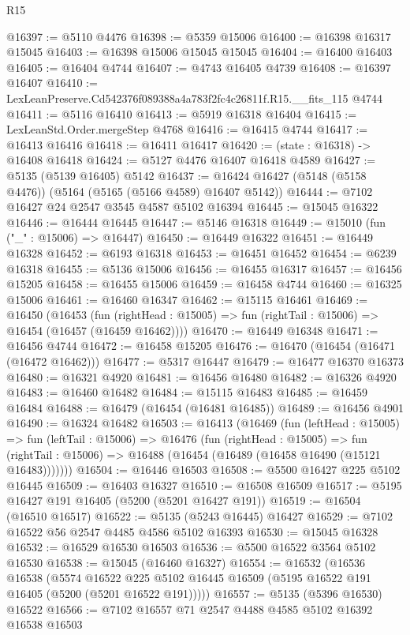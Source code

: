 \begin{lexlean}{R15}
\begin{coremodule}
{{{{{{{{{{{@16397 := @5110 @4476
@16398 := @5359 @15006
@16400 := @16398 @16317 @15045
@16403 := @16398 @15006 @15045 @15045
@16404 := @16400 @16403
@16405 := @16404 @4744
@16407 := @4743 @16405 @4739
@16408 := @16397 @16407
@16410 := LexLeanPreserve.Cd542376f089388a4a783f2fc4c26811f.R15.__fits_115 @4744
@16411 := @5116 @16410
@16413 := @5919 @16318 @16404
@16415 := LexLeanStd.Order.mergeStep @4768
@16416 := @16415 @4744
@16417 := @16413 @16416
@16418 := @16411 @16417
@16420 := (state : @16318) -> @16408 @16418
@16424 := @5127 @4476 @16407 @16418 @4589
@16427 := @5135 (@5139 @16405) @5142
@16437 := @16424 @16427 (@5148 (@5158 @4476)) (@5164 (@5165 (@5166 @4589) @16407 @5142))
@16444 := @7102 @16427 @24 @2547 @3545 @4587 @5102 @16394
@16445 := @15045 @16322
@16446 := @16444 @16445
@16447 := @5146 @16318
@16449 := @15010 (fun ("_" : @15006) => @16447)
@16450 := @16449 @16322
@16451 := @16449 @16328
@16452 := @6193 @16318
@16453 := @16451 @16452
@16454 := @6239 @16318
@16455 := @5136 @15006
@16456 := @16455 @16317
@16457 := @16456 @15205
@16458 := @16455 @15006
@16459 := @16458 @4744
@16460 := @16325 @15006
@16461 := @16460 @16347
@16462 := @15115 @16461
@16469 := @16450
    (@16453
      (fun (rightHead : @15005) => fun (rightTail : @15006) => @16454 (@16457 (@16459 @16462))))
@16470 := @16449 @16348
@16471 := @16456 @4744
@16472 := @16458 @15205
@16476 := @16470 (@16454 (@16471 (@16472 @16462)))
@16477 := @5317 @16447
@16479 := @16477 @16370 @16373
@16480 := @16321 @4920
@16481 := @16456 @16480
@16482 := @16326 @4920
@16483 := @16460 @16482
@16484 := @15115 @16483
@16485 := @16459 @16484
@16488 := @16479 (@16454 (@16481 @16485))
@16489 := @16456 @4901
@16490 := @16324 @16482
@16503 := @16413
    (@16469
      (fun (leftHead : @15005) =>
      fun (leftTail : @15006) =>
      @16476
        (fun (rightHead : @15005) =>
        fun (rightTail : @15006) => @16488 (@16454 (@16489 (@16458 @16490 (@15121 @16483)))))))
@16504 := @16446 @16503
@16508 := @5500 @16427 @225 @5102 @16445
@16509 := @16403 @16327
@16510 := @16508 @16509
@16517 := @5195 @16427 @191 @16405 (@5200 (@5201 @16427 @191))
@16519 := @16504 (@16510 @16517)
@16522 := @5135 (@5243 @16445) @16427
@16529 := @7102 @16522 @56 @2547 @4485 @4586 @5102 @16393
@16530 := @15045 @16328
@16532 := @16529 @16530 @16503
@16536 := @5500 @16522 @3564 @5102 @16530
@16538 := @15045 (@16460 @16327)
@16554 := @16532
    (@16536
      @16538
      (@5574
        @16522
        @225
        @5102
        @16445
        @16509
        (@5195 @16522 @191 @16405 (@5200 (@5201 @16522 @191)))))
@16557 := @5135 (@5396 @16530) @16522
@16566 := @7102 @16557 @71 @2547 @4488 @4585 @5102 @16392 @16538 @16503
}}}}}}}}}}}
\end{coremodule}
\end{lexlean}
